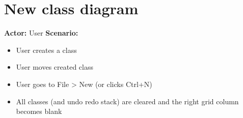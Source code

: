 \section{New class diagram}
\textbf{Actor:} User
\textbf{Scenario:}
\begin{itemize}
\item User creates a class
\item User moves created class
\item User goes to File > New (or clicks Ctrl+N)
\item All classes (and undo redo stack) are cleared and the right grid column becomes blank
\end{itemize}